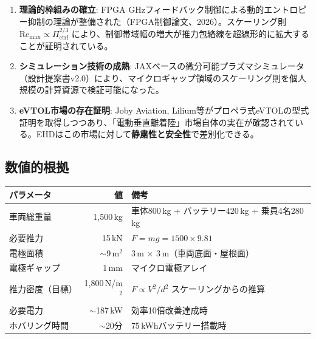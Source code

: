 \documentclass[12pt,a4paper]{ltjsarticle}
\begin{document}
\begin{enumerate}[leftmargin=2em]
  \item \textbf{理論的枠組みの確立}: FPGA GHzフィードバック制御による動的エントロピー抑制の理論が整備された（FPGA制御論文、2026）。スケーリング則 $\mathrm{Re}_{\max} \propto \Pi_{\mathrm{ctrl}}^{2/3}$ により、制御帯域幅の増大が推力包絡線を超線形的に拡大することが証明されている。
  \item \textbf{シミュレーション技術の成熟}: JAXベースの微分可能プラズマシミュレータ（設計提案書v2.0）により、マイクロギャップ領域のスケーリング則を個人規模の計算資源で検証可能になった。
  \item \textbf{eVTOL市場の存在証明}: Joby Aviation, Lilium等がプロペラ式eVTOLの型式証明を取得しつつあり、「電動垂直離着陸」市場自体の実在が確認されている。EHDはこの市場に対して\textbf{静粛性と安全性}で差別化できる。
\end{enumerate}

\subsection{数値的根拠}

\begin{keybox}[空飛ぶ車の物理的パラメータ]
\begin{center}
\sffamily
\begin{tabular}{@{}lrl@{}}
\toprule
\textbf{パラメータ} & \textbf{値} & \textbf{備考} \\
\midrule
車両総重量 & 1,500\,kg & 車体800\,kg + バッテリー420\,kg + 乗員4名280\,kg \\
必要推力 & 15\,kN & $F = mg = 1500 \times 9.81$ \\
電極面積 & $\sim$9\,m$^2$ & 3\,m $\times$ 3\,m（車両底面・屋根面） \\
電極ギャップ & 1\,mm & マイクロ電極アレイ \\
推力密度（目標） & 1,800\,N/m$^2$ & $F \propto V^2/d^2$ スケーリングからの推算 \\
必要電力 & $\sim$187\,kW & 効率10倍改善達成時 \\
ホバリング時間 & $\sim$20分 & 75\,kWhバッテリー搭載時 \\
\bottomrule
\end{tabular}
\end{center}
\end{keybox}

\newpage
\end{document}
